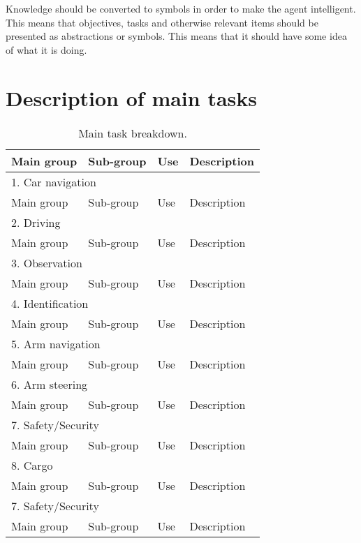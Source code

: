 \documentclass[%
oneside,    %
project,    %
nosummary   %
]{USN-MSc}
\begin{document}
Knowledge should be converted to symbols in order to make the agent intelligent. This means that objectives, tasks and otherwise relevant items should be presented as abstractions or symbols. This means that it should have some idea of what it is doing.

\section{Description of main tasks}

\begin{table}[!ht]
  \caption{Main task breakdown.}
  \centering
  \begin{tabular}{| m{1.5cm} | m{2cm} | m{1cm} | m{5cm} |}
    \hline
    Main group & Sub-group & Use & Description \\ \hline
    \multicolumn{4}{|l|}{1. Car navigation}        \\ \hline
    Main group & Sub-group & Use & Description \\ \hline
    \multicolumn{4}{|l|}{2. Driving}        \\ \hline
    Main group & Sub-group & Use & Description \\ \hline
    \multicolumn{4}{|l|}{3. Observation}        \\ \hline
    Main group & Sub-group & Use & Description \\ \hline
    \multicolumn{4}{|l|}{4. Identification}        \\ \hline
    Main group & Sub-group & Use & Description \\ \hline
    \multicolumn{4}{|l|}{5. Arm navigation}        \\ \hline
    Main group & Sub-group & Use & Description \\ \hline
    \multicolumn{4}{|l|}{6. Arm steering}        \\ \hline
    Main group & Sub-group & Use & Description \\ \hline
    \multicolumn{4}{|l|}{7. Safety/Security}        \\ \hline
    Main group & Sub-group & Use & Description \\ \hline
    \multicolumn{4}{|l|}{8. Cargo}        \\ \hline
    Main group & Sub-group & Use & Description \\ \hline
    \multicolumn{4}{|l|}{7. Safety/Security}        \\ \hline
    Main group & Sub-group & Use & Description \\ \hline
  \end{tabular}
  \label{tab:breakdown}
\end{table}
\end{document}
